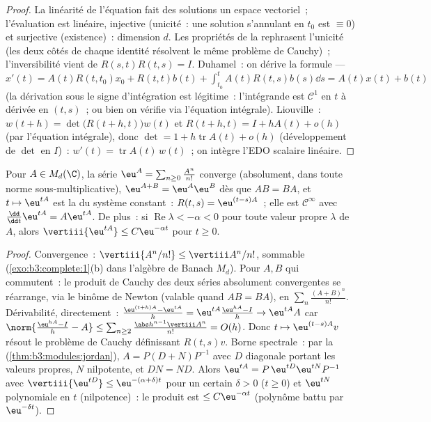 \begin{proof}
La linéarité de l'équation fait des solutions un espace
vectoriel~; l'évaluation est linéaire, injective (unicité~: une
solution s'annulant en $t_0$ est $\equiv 0$) et surjective
(existence)~: dimension $d$. Les propriétés de la 
rephrasent l'unicité (les deux côtés de chaque identité
résolvent le même problème de Cauchy)~; l'inversibilité vient
de $R(s,t)R(t,s) = I$. Duhamel~: on dérive la formule ---
$x'(t) = A(t)R(t,t_0)x_0 + R(t,t)b(t) +
\int_{t_0}^tA(t)R(t,s)b(s)\dd s = A(t)x(t) + b(t)$ (la
dérivation sous le signe d'intégration est légitime~:
l'intégrande est $\mathcal C^1$ en $t$ à dérivée  en
$(t,s)$~; ou bien on vérifie via l'équation intégrale).
Liouville~: $w(t + h) = \det\bigl(R(t+h, t)\bigr)w(t)$ et
$R(t + h, t) = I + hA(t) + o(h)$ (par l'équation intégrale),
donc $\det = 1 + h\operatorname{tr}A(t) + o(h)$
(développement de $\det$ en $I$)~: $w'(t) =
\operatorname{tr}A(t)\,w(t)$~; on intègre l'EDO scalaire
linéaire.
\end{proof}

\begin{theorem}\label{thm:b3:ode:matrixexp}
Pour $A \in M_d(\C)$, la série $\eu^{A} =
\sum_{n\geq0}\frac{A^n}{n!}$ converge (absolument, dans toute
norme sous-multiplicative), $\eu^{A+B} = \eu^A\eu^B$ dès que
$AB = BA$, et $t \mapsto \eu^{tA}$ est la  du
système constant~: $R(t,s) = \eu^{(t-s)A}$~; elle est
$\mathcal C^\infty$ avec $\frac{\dd}{\dd t}\eu^{tA} =
A\eu^{tA}$. De plus~: si $\operatorname{Re}\lambda < -\alpha
< 0$ pour toute valeur propre $\lambda$ de $A$, alors
$\vertiii{\eu^{tA}} \leq C\eu^{-\alpha t}$ pour $t \geq
0$.
\end{theorem}

\begin{proof}
Convergence~: $\vertiii{A^n/n!} \leq \vertiii A^n/n!$,
sommable (\cref{exo:b3:complete:1}(b) dans l'algèbre de Banach
$M_d$). Pour $A, B$ qui commutent~: le produit de Cauchy des
deux séries absolument convergentes se réarrange, via le
binôme de Newton (valable quand $AB = BA$), en
$\sum_n\frac{(A+B)^n}{n!}$. Dérivabilité, directement~:
$\frac{\eu^{(t+h)A} - \eu^{tA}}h = \eu^{tA}\frac{\eu^{hA} -
I}{h} \to \eu^{tA}A$ car $\norm{\frac{\eu^{hA} - I}h - A}
\leq \sum_{n\geq2}\frac{\abs h^{n-1}\vertiii A^n}{n!} =
O(h)$. Donc $t \mapsto \eu^{(t - s)A}v$ résout le problème de
Cauchy définissant $R(t,s)v$. Borne spectrale~: par la  (\cref{thm:b3:modules:jordan}), $A = P(D +
N)P^{-1}$ avec $D$ diagonale portant les valeurs propres, $N$
nilpotente, et $DN = ND$. Alors $\eu^{tA} =
P\,\eu^{tD}\eu^{tN}P^{-1}$ avec $\vertiii{\eu^{tD}} \leq
\eu^{-(\alpha + \delta)t}$ pour un certain $\delta > 0$
($t \geq 0$) et $\eu^{tN}$ polynomiale en $t$
(nilpotence)~: le produit est $\leq C\eu^{-\alpha t}$
(polynôme battu par $\eu^{-\delta t}$).
\end{proof}

